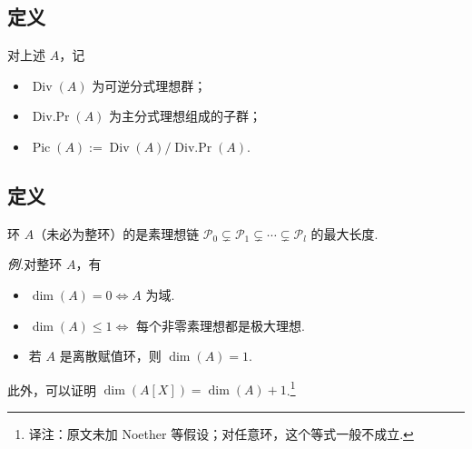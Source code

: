 \subsection{定义}\label{sec:nt-3-2-3}
\begin{definition*}
对上述 $A$，记
\begin{itemize}
\item $\operatorname{Div}(A)$ 为可逆分式理想群；
\item $\operatorname{Div.Pr}(A)$ 为主分式理想组成的子群；
\item $\operatorname{Pic}(A):=\operatorname{Div}(A)/\operatorname{Div.Pr}(A)$.
\end{itemize}
\end{definition*}
\subsection{定义}\label{sec:nt-3-2-4}
\begin{definition*}
环 $A$（未必为整环）的是素理想链 $\mathcal P_0\subsetneq\mathcal P_1\subsetneq\cdots\subsetneq\mathcal P_l$ 的最大长度.
\end{definition*}
\emph{例.}对整环 $A$，有
\begin{itemize}
\item $\dim(A)=0\Longleftrightarrow A$ 为域.
\item $\dim(A)\le1\Longleftrightarrow$ 每个非零素理想都是极大理想.
\item 若 $A$ 是离散赋值环，则 $\dim(A)=1$.
\end{itemize}
此外，可以证明 $\dim(A[X])=\dim(A)+1$.\footnote{译注：原文未加 Noether 等假设；对任意环，这个等式一般不成立.}
